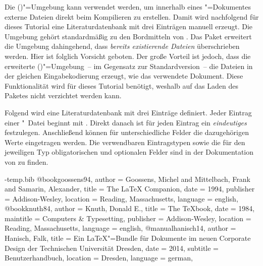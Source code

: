 \documentclass[%
  english,ngerman,%
  cdgeometry=no,DIV=12,%
  cd=false,cdfont=false,cdtitle=true,%
  headings=normal,%
  automark,%
  listof=toc,%
]{tudscrartcl}
\begin{document}
Die ()"=Umgebung kann verwendet 
werden, um innerhalb eines "=Dokumentes externe Dateien direkt 
beim Kompilieren zu erstellen. Damit wird nachfolgend für dieses Tutorial eine 
Literaturdatenbank  mit drei Einträgen manuell erzeugt. 
Die Umgebung gehört standardmäßig zu den Bordmitteln von . Das 
Paket  erweitert die Umgebung dahingehend, dass 
\emph{bereits existierende Dateien} überschrieben werden. Hier ist folglich 
Vorsicht geboten. Der große Vorteil ist jedoch, dass die erweiterte 
()"=Umgebung~-- im Gegensatz 
zur Standardversion~-- die Dateien in der gleichen Eingabekodierung erzeugt, 
wie das verwendete Dokument. Diese Funktionalität wird für dieses Tutorial 
benötigt, weshalb auf das Laden des Paketes  nicht 
verzichtet werden kann. 
%
\begin{Preamble}
\usepackage{filecontents}
\end{Preamble}
%
Folgend wird eine Literaturdatenbank mit drei Einträge definiert. Jeder Eintrag 
einer "~Datei beginnt mit . Direkt 
danach ist für jeden Eintrag ein \emph{eindeutiges}  
festzulegen. Anschließend können für unterschiedliche Felder die dazugehörigen 
Werte eingetragen werden. Die verwendbaren Eintragstypen sowie die für den 
jeweiligen Typ obligatorischen und optionalen Felder sind in der Dokumentation 
von  zu finden.
%
\begin{Preamble*}
\begin{filecontents}{\jobname-temp.bib}
@book{goossens94,
  author    = {Goossens, Michel and Mittelbach, Frank
               and Samarin, Alexander},
  title     = {The LaTeX Companion},
  date      = {1994},
  publisher = {Addison-Wesley},
  location  = {Reading, Massachusetts},
  language  = {english},
}
@book{knuth84,
  author    = {Knuth, Donald E.},
  title     = {The \TeX book},
  date      = {1984},
  maintitle = {Computers \& Typesetting},
  publisher = {Addison-Wesley},
  location  = {Reading, Massachusetts},
  language  = {english},
}
@manual{hanisch14,
  author    = {Hanisch, Falk},
  title     = {Ein \LaTeX"=Bundle für Dokumente im neuen Corporate 
               Design der Technischen Universität Dresden},
  date      = {2014},
  subtitle  = {Benutzerhandbuch},
  location  = {Dresden},
  language  = {german},
}
\end{filecontents}
\end{Preamble*}
\end{document}
